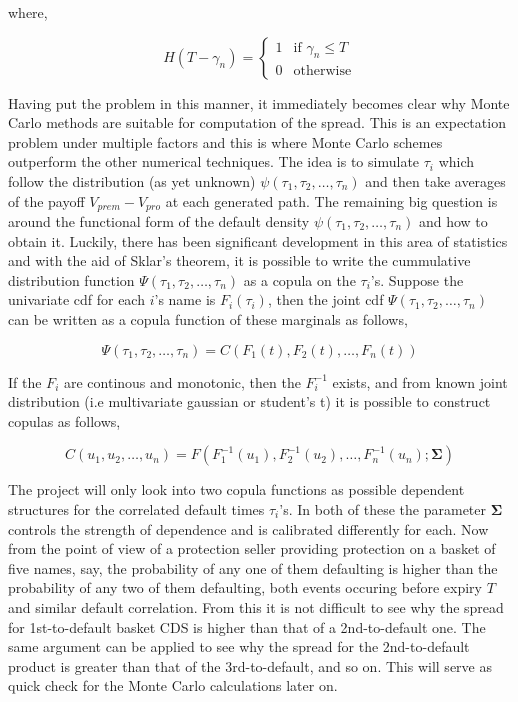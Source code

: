 \documentclass[a4paper,12pt]{article}
\begin{document}
where, 

$$ H(T - \gamma_n) = \begin{cases} 1 & \text{if } \gamma_n \leq T \\ 0 & \text{otherwise} \end{cases} $$

Having put the problem in this manner, it immediately becomes clear why Monte Carlo methods are suitable for computation of the spread. This is an expectation problem under multiple factors and this is where Monte Carlo schemes outperform the other numerical techniques. The idea is to simulate $\tau_i$ which follow the distribution (as yet unknown) $\psi(\tau_1, \tau_2, \dots, \tau_n)$ and then take averages of the payoff $V_{prem} - V_{pro}$ at each generated path.
\newline 
The remaining big question is around the functional form of the default density $\psi(\tau_1, \tau_2, \dots, \tau_n)$ and how to obtain it. Luckily, there has been significant development in this area of statistics and with the aid of Sklar's theorem, it is possible to write the cummulative distribution function $\Psi(\tau_1, \tau_2, \dots, \tau_n)$ as a copula on the $\tau_i$'s. Suppose the univariate cdf for each $i$'s name is $F_i(\tau_i)$, then the joint cdf $\Psi(\tau_1, \tau_2, \dots, \tau_n)$ can be written as a copula function of these marginals as follows, 

\begin{equation}
\Psi(\tau_1, \tau_2, \dots, \tau_n) = C(F_1(t), F_2(t), \dots, F_n(t))
\end{equation}

If the $F_i$ are continous and monotonic, then the $F_i^{-1}$ exists, and from known joint distribution (i.e multivariate gaussian or student's t) it is possible to construct copulas as follows, 

\begin{equation}
C(u_1, u_2, \dots, u_n) = F(F_1^{-1}(u_1), F_2^{-1}(u_2), \dots, F_n^{-1}(u_n); \mathbf{\Sigma})
\end{equation}

The project will only look into two copula functions as possible dependent structures for the correlated default times $\tau_i$'s. In both of these the parameter $\mathbf{\Sigma}$ controls the strength of dependence and is calibrated differently for each. 
\newline
Now from the point of view of a protection seller providing protection on a basket of five names, say, the probability of any one of them defaulting is higher than the probability of any two of them defaulting, both events occuring before expiry $T$ and similar default correlation. From this it is not difficult to see why the spread for 1st-to-default basket CDS is higher than that of a 2nd-to-default one. The same argument can be applied to see why the spread for the 2nd-to-default product is greater  than that of the 3rd-to-default, and so on. This will serve as quick check for the Monte Carlo calculations later on.
\end{document}
